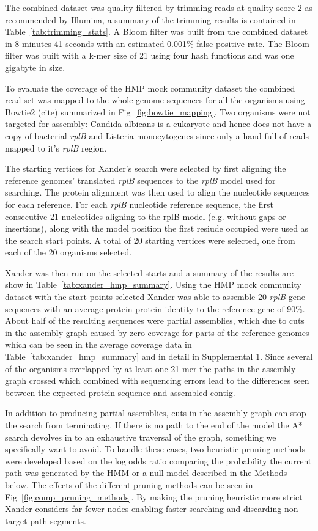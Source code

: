 \documentclass[10pt]{bmc_article}
\newenvironment{bmcformat}{\begin{raggedright}\baselineskip20pt\sloppy\setboolean{publ}{false}}{\end{raggedright}\baselineskip20pt\sloppy}
\begin{document}
\begin{bmcformat}
The combined dataset was quality filtered by trimming reads at quality score 2 as recommended by Illumina\cite{Mann2009}, a summary of the trimming results is contained in Table~\ref{tab:trimming_stats}.  A Bloom filter was built from the combined dataset in 8 minutes 41 seconds with an estimated 0.001\% false positive rate.  The Bloom filter was built with a k-mer size of 21 using four hash functions and was one gigabyte in size.

To evaluate the coverage of the HMP mock community dataset the combined read set was mapped to the whole genome sequences for all the organisms using Bowtie2 (cite) summarized in Fig~\ref{fig:bowtie_mapping}.  Two organisms were not targeted for assembly: Candida albicans is a eukaryote and hence does not have a copy of bacterial \emph{rplB} and Listeria monocytogenes since only a hand full of reads mapped to it's \emph{rplB} region.

The starting vertices for Xander's search were selected by first aligning the reference genomes' translated \emph{rplB} sequences to the \emph{rplB} model used for searching.  The protein alignment was then used to align the nucleotide sequences for each reference.  For each \emph{rplB} nucleotide reference sequence, the first consecutive 21 nucleotides aligning to the rplB model (e.g. without gaps or insertions), along with the model position the first resiude occupied were used as the search start points.  A total of 20 starting vertices were selected, one from each of the 20 organisms selected.

Xander was then run on the selected starts and a summary of the results are show in Table~\ref{tab:xander_hmp_summary}.  Using the HMP mock community dataset with the start points selected Xander was able to assemble 20 \emph{rplB} gene sequences with an average protein-protein identity to the reference gene of 90\%.  About half of the resulting sequences were partial assemblies, which due to cuts in the assembly graph caused by zero coverage for parts of the reference genomes which can be seen in the average coverage data in Table~\ref{tab:xander_hmp_summary} and in detail in Supplemental 1.  Since several of the organisms overlapped by at least one 21-mer the paths in the assembly graph crossed which combined with sequencing errors lead to the differences seen between the expected protein sequence and assembled contig.

In addition to producing partial assemblies, cuts in the assembly graph can stop the search from terminating. If there is no path to the end of the model the A* search devolves in to an exhaustive traversal of the graph, something we specifically want to avoid.  To handle these cases, two heuristic pruning methods were developed based on the log odds ratio comparing the probability the current path was generated by the HMM or a null model described in the Methods below.  The effects of the different pruning methods can be seen in Fig~\ref{fig:comp_pruning_methods}.  By making the pruning heuristic more strict Xander considers far fewer nodes enabling faster searching and discarding non-target path segments.


\end{bmcformat}
\end{document}
